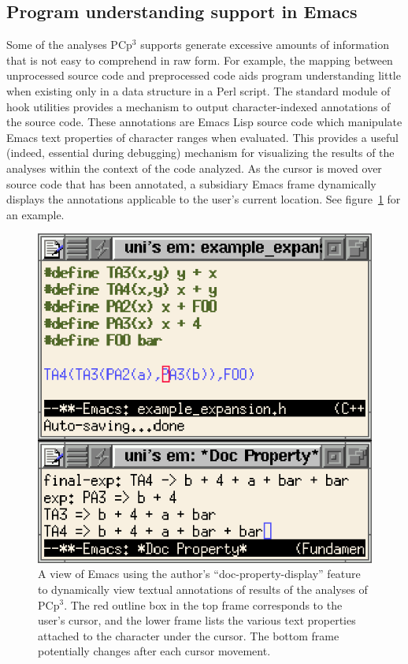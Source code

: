 \documentclass{article}
\newcommand{\pcp}{\mbox{\textsf{PCp}$^3$}}
\newcommand{\Perl}{\mbox{\textsf{Perl}}}
\begin{document}
\subsection{Program understanding support in Emacs}
Some of the analyses \pcp{} supports generate excessive amounts of
information that is not easy to comprehend in raw form.  For example,
the mapping between unprocessed source code and preprocessed code aids
program understanding little when existing only in a data structure in a
\Perl{} script.  The standard module of hook utilities provides a
mechanism to output character-indexed annotations of the source code.
These annotations are Emacs Lisp source code which manipulate Emacs text
properties of character ranges when evaluated.  This provides a useful
(indeed, essential during debugging) mechanism for visualizing the
results of the analyses within the context of the code analyzed.  As the
cursor is moved over source code that has been annotated, a subsidiary
Emacs frame dynamically displays the annotations applicable to the
user's current location. See figure~\ref{fig:emacsdocprop} for an
example.

\begin{figure}[p]
  \begin{center}
    \leavevmode
    \includegraphics{figs/doc-prop.ps}
    \caption{A view of Emacs using the author's ``doc-property-display''
      feature to dynamically view textual annotations of results of the
      analyses of \pcp{}.  The red outline box in the top frame
      corresponds to the user's cursor, and the lower frame lists the
      various text properties attached to the character under the
      cursor.  The bottom frame potentially changes after each cursor movement.}
    \label{fig:emacsdocprop}
  \end{center}
\end{figure}
\end{document}
